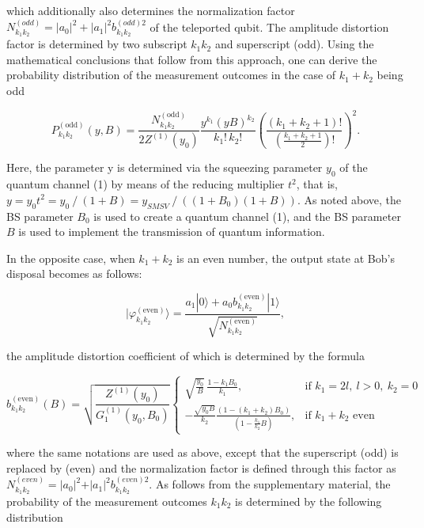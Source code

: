 \documentclass{optica-article}
\begin{document}
\!\!\!\!\!\!which additionally also determines the normalization factor $N_{k_1 k_2}^{(odd)}=\lvert a_0 \rvert ^2+\lvert a_1 \rvert^2 b_{k_1 k_2}^{(odd)2}$ of the teleported qubit. The amplitude distortion factor is determined by two subscript $k_1$$k_2$ and superscript (odd). Using the mathematical conclusions that follow from this approach, one can derive the probability distribution of the measurement outcomes in the case of $k_1+k_2$ being odd 


\begin{equation}\label{eq:5}
		P_{k_1 k_2}^{(\text{odd})}(y,B) = \frac{N_{k_1 k_2}^{(\text{odd})}}{2 Z^{(1)}(y_0)} \frac{y^{k_1} (yB)^{k_2}}{k_1! \, k_2!} \left( \frac{(k_1+k_2+1)!}{\left(\frac{k_1+k_2+1}{2}\right)!} \right)^2.
\end{equation}


\!\!\!\!\!\!Here, the parameter y is determined via the squeezing parameter $y_0$ of the quantum channel (1) by means of the reducing multiplier $t^2$, that is, $y=y_0t^2=y_0⁄(1+B)=y_{SMSV}⁄((1+B_0 )(1+B))$. As noted above, the BS parameter $B_0$ is used to create a quantum channel (1), and the BS parameter $B$ is used to implement the transmission of quantum information.
\par In the opposite case, when $k_1+k_2$ is an even number, the output state at Bob's disposal becomes as follows:

\begin{equation}\label{eq:6}
		|\varphi_{k_1 k_2}^{(\text{even})}\rangle = \frac{a_1 |0\rangle + a_0b_{k_1 k_2}^{(\text{even})} |1\rangle}{\sqrt{N_{k_1 k_2}^{(\text{even})}}},
\end{equation}


\!\!\!\!\!\!the amplitude distortion coefficient of which is determined by the formula

\begin{equation}\label{eq:7}
		b_{k_1 k_2}^{(\text{even})}(B) =  \sqrt{\frac{Z^{(1)}(y_0)}{G_1^{(1)}(y_0,B_0)}} 
		\begin{cases}
			\sqrt{\frac{y_0}{B}}\,\frac{1-k_1B_0}{k_1} , & \!\!\!\!\!\!\!\!\!\!\!\!\!\!\!\!\!\!\!\!\!
            \text{if } k_1 = 2l,\ l>0,\ k_2 = 0 \\[3ex]
			-\frac{\sqrt{y_0B}}{k_2}\frac{(1-(k_1+k_2)B_0)}{(1-\frac{k_1}{k_2}B)}, & \!\!\!\!\text{if } k_1+k_2 \text{ even}
		\end{cases}
\end{equation}


\!\!\!\!\!\!where the same notations are used as above, except that the superscript (odd) is replaced by (even) and the normalization factor is defined through this factor as $N_{k_1 k_2}^{(even)} =\rvert a_0 \lvert ^2+\rvert a_1 \lvert ^2 b_{k_1 k_2}^{(even)2}$. As follows from the supplementary material, the probability of the measurement outcomes $k_1 k_2$  is determined by the following distribution 
\end{document}
